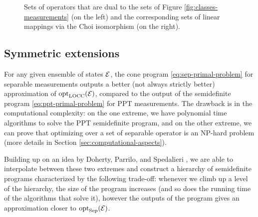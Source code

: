 \begin{figure}[!ht]
  \centering
    \begin{minipage}{0.5\textwidth}
      \centering
      \def\svgwidth{200pt}
      \scalebox{.75}{}
    \end{minipage}\hfill
    \begin{minipage}{0.5\textwidth}
      \centering
      \def\svgwidth{200pt}
      \scalebox{.75}{}
    \end{minipage}
    \caption{Sets of operators that are dual to the sets of Figure 
    \ref{fig:classes-measurements} (on the left) and the 
    corresponding sets of linear mappings via the Choi isomorphism (on the right).}
    \label{fig:measurements-dual}
\end{figure}

\subsection{Symmetric extensions}
\label{sec:symm-ext}
For any given ensemble of states $\mathcal{E}$, the cone program \eqref{eq:sep-primal-problem}
for separable measurements outputs a better (not always strictly better) approximation of $\operatorname{opt}_{\mathrm{LOCC}}(\mathcal{E})$, 
compared to the output of the semidefinite program \eqref{eq:ppt-primal-problem} for PPT measurements.
The drawback is in the computational complexity: on the one extreme, we have 
polynomial time algorithms to solve the PPT semidefinite program, and on the other 
extreme, we can prove that optimizing over a set of separable operator is an NP-hard 
problem (more details in Section \ref{sec:computational-aspects}).

Building up on an idea by Doherty, Parrilo, and Spedalieri \cite{Doherty02,Doherty04}, 
we are able to interpolate between these two extremes and construct a hierarchy of
semidefinite programs characterized by the following trade-off: whenever we 
climb up a level of the hierarchy, the size of the program increases 
(and so does the running time of the algorithms that solve it), however the
outputs of the program gives an approximation closer to $\operatorname{opt}_{\mathrm{Sep}}(\mathcal{E})$.

